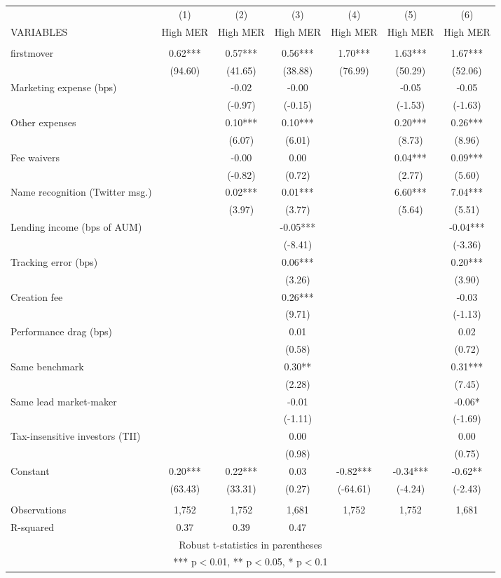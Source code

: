\documentclass[]{article}
\begin{document}
\begin{tabular}{lcccccc} \hline
 & (1) & (2) & (3) & (4) & (5) & (6) \\
VARIABLES & High MER & High MER & High MER & High MER & High MER & High MER \\ \hline
 &  &  &  &  &  &  \\
firstmover & 0.62*** & 0.57*** & 0.56*** & 1.70*** & 1.63*** & 1.67*** \\
 & (94.60) & (41.65) & (38.88) & (76.99) & (50.29) & (52.06) \\
Marketing expense (bps) &  & -0.02 & -0.00 &  & -0.05 & -0.05 \\
 &  & (-0.97) & (-0.15) &  & (-1.53) & (-1.63) \\
Other expenses &  & 0.10*** & 0.10*** &  & 0.20*** & 0.26*** \\
 &  & (6.07) & (6.01) &  & (8.73) & (8.96) \\
Fee waivers &  & -0.00 & 0.00 &  & 0.04*** & 0.09*** \\
 &  & (-0.82) & (0.72) &  & (2.77) & (5.60) \\
Name recognition (Twitter msg.) &  & 0.02*** & 0.01*** &  & 6.60*** & 7.04*** \\
 &  & (3.97) & (3.77) &  & (5.64) & (5.51) \\
Lending income (bps of AUM) &  &  & -0.05*** &  &  & -0.04*** \\
 &  &  & (-8.41) &  &  & (-3.36) \\
Tracking error (bps) &  &  & 0.06*** &  &  & 0.20*** \\
 &  &  & (3.26) &  &  & (3.90) \\
Creation fee &  &  & 0.26*** &  &  & -0.03 \\
 &  &  & (9.71) &  &  & (-1.13) \\
Performance drag (bps) &  &  & 0.01 &  &  & 0.02 \\
 &  &  & (0.58) &  &  & (0.72) \\
Same benchmark &  &  & 0.30** &  &  & 0.31*** \\
 &  &  & (2.28) &  &  & (7.45) \\
Same lead market-maker &  &  & -0.01 &  &  & -0.06* \\
 &  &  & (-1.11) &  &  & (-1.69) \\
Tax-insensitive investors (TII) &  &  & 0.00 &  &  & 0.00 \\
 &  &  & (0.98) &  &  & (0.75) \\
Constant & 0.20*** & 0.22*** & 0.03 & -0.82*** & -0.34*** & -0.62** \\
 & (63.43) & (33.31) & (0.27) & (-64.61) & (-4.24) & (-2.43) \\
 &  &  &  &  &  &  \\
Observations & 1,752 & 1,752 & 1,681 & 1,752 & 1,752 & 1,681 \\
 R-squared & 0.37 & 0.39 & 0.47 &  &  &  \\ \hline
\multicolumn{7}{c}{ Robust t-statistics in parentheses} \\
\multicolumn{7}{c}{ *** p$<$0.01, ** p$<$0.05, * p$<$0.1} \\
\end{tabular}
\end{document}
